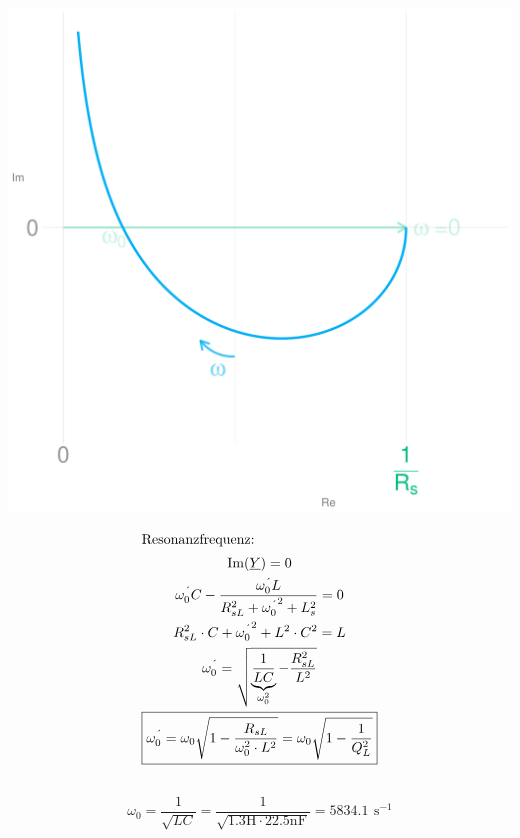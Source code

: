 \documentclass[a4paper, 12pt]{article}
\begin{document}
    \begin{center}
      \includegraphics[scale=0.3819660112501051]{./R/2_4/2_4_OK.pdf}
    \end{center}

      \begin{gather*}
        \intertext{Resonanzfrequenz:}
        \text{Im}{(\underline{Y})} = 0\\
        \omega_0^{\text{´}} C - \frac{\omega_0^{\text{´}} L}{R_{sL}^2 + {\omega_0^{\text{´}}}^2 + L_s^2} = 0\\
        R_{sL}^2 \cdot C + {\omega_0^{\text{´}}}^2+L^2 \cdot C^2 = L\\
        \omega_0^{\text{´}} = \sqrt{ \underbrace{\frac{1}{LC}}_{\omega_0^2} - \frac{R_{sL}^2}{L^2} }\\
        \boxed{\omega_0^{\text{´}} = \omega_0 \sqrt{1-\frac{R_{sL}}{\omega_0^2 \cdot L^2} } = \omega_0 \sqrt{1-\frac{1}{Q_L^2}}}
      \end{gather*}

  \subsection{}
    $$\omega_0 = \frac{1}{\sqrt{LC}} = \frac{1}{ \sqrt{1.3 \si{\henry} \cdot 22.5 \si{\nano\farad}} } = 5834.1 \,\ \si{\second}^{-1}$$
\end{document}
